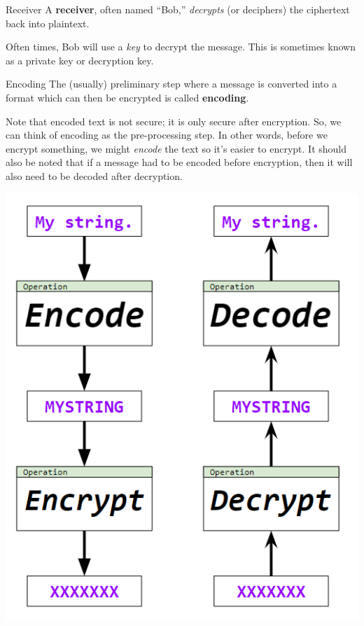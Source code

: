 \documentclass[letterpaper]{article}
\newcommand{\0}{\mathbf{0}}
\begin{document}
\begin{definition}{Receiver}{}
    A \textbf{receiver}, often named ``Bob,'' \emph{decrypts} (or deciphers) the ciphertext back into plaintext. 
\end{definition}
Often times, Bob will use a \emph{key} to decrypt the message. This is sometimes known as a private key or decryption key.

\begin{definition}{Encoding}{}
    The (usually) preliminary step where a message is converted into a format which can then be encrypted is called \textbf{encoding}. 
\end{definition}
Note that encoded text is not secure; it is only secure after encryption. So, we can think of encoding as the pre-processing step. In other words, before we encrypt something, we might \emph{encode} the text so it's easier to encrypt. It should also be noted that if a message had to be encoded before encryption, then it will also need to be decoded after decryption. 

\begin{center}
    \includegraphics[scale=0.8]{assets/encode_encrypt.png}
\end{center}
\end{document}
